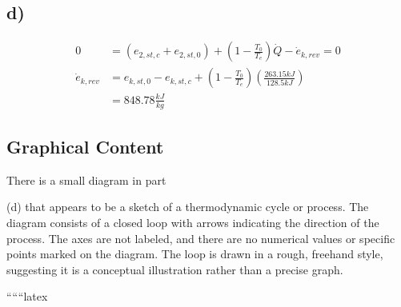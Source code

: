 

\subsection*{d)}

\begin{align*}
0 &= (e_{2,st,c} + e_{2,st,0}) + \left( 1 - \frac{T_0}{T_e} \right) \dot{Q} - \dot{e}_{k,rev} = 0 \\
\dot{e}_{k,rev} &= e_{k,st,0} - e_{k,st,c} + \left( 1 - \frac{T_0}{T_e} \right) \left( \frac{263.15 kJ}{128.5 kJ} \right) \\
&= 848.78 \frac{kJ}{kg}
\end{align*}

\subsection*{Graphical Content}

There is a small diagram in part

(d) that appears to be a sketch of a thermodynamic cycle or process. The diagram consists of a closed loop with arrows indicating the direction of the process. The axes are not labeled, and there are no numerical values or specific points marked on the diagram. The loop is drawn in a rough, freehand style, suggesting it is a conceptual illustration rather than a precise graph.

``````latex